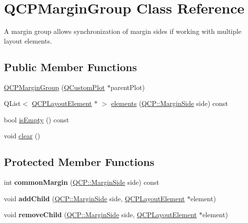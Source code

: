 \hypertarget{classQCPMarginGroup}{\section{\-Q\-C\-P\-Margin\-Group \-Class \-Reference}
\label{classQCPMarginGroup}
}


\-A margin group allows synchronization of margin sides if working with multiple layout elements.  


\subsection*{\-Public \-Member \-Functions}
\begin{DoxyCompactItemize}
\item 
\hyperlink{classQCPMarginGroup_ac481c20678ec5b305d6df330715f4b7b}{\-Q\-C\-P\-Margin\-Group} (\hyperlink{classQCustomPlot}{\-Q\-Custom\-Plot} $\ast$parent\-Plot)
\item 
\-Q\-List$<$ \hyperlink{classQCPLayoutElement}{\-Q\-C\-P\-Layout\-Element} $\ast$ $>$ \hyperlink{classQCPMarginGroup_a2f39e319c9ece34e0392c2ca350f1069}{elements} (\hyperlink{namespaceQCP_a7e487e3e2ccb62ab7771065bab7cae54}{\-Q\-C\-P\-::\-Margin\-Side} side) const 
\item 
bool \hyperlink{classQCPMarginGroup_a28c8e87a0b87c01bd28c693faabddd7b}{is\-Empty} () const 
\item 
void \hyperlink{classQCPMarginGroup_a144b67f216e4e86c3a3a309e850285fe}{clear} ()
\end{DoxyCompactItemize}
\subsection*{\-Protected \-Member \-Functions}
\begin{DoxyCompactItemize}
\item 
\hypertarget{classQCPMarginGroup_aeaeba9068dba2ef8be41449f0f2582f7}{int {\bfseries common\-Margin} (\hyperlink{namespaceQCP_a7e487e3e2ccb62ab7771065bab7cae54}{\-Q\-C\-P\-::\-Margin\-Side} side) const }\label{classQCPMarginGroup_aeaeba9068dba2ef8be41449f0f2582f7}

\item 
\hypertarget{classQCPMarginGroup_acb9c3a35acec655c2895b7eb95ee0524}{void {\bfseries add\-Child} (\hyperlink{namespaceQCP_a7e487e3e2ccb62ab7771065bab7cae54}{\-Q\-C\-P\-::\-Margin\-Side} side, \hyperlink{classQCPLayoutElement}{\-Q\-C\-P\-Layout\-Element} $\ast$element)}\label{classQCPMarginGroup_acb9c3a35acec655c2895b7eb95ee0524}

\item 
\hypertarget{classQCPMarginGroup_a20ab3286062957d99b58db683fe725b0}{void {\bfseries remove\-Child} (\hyperlink{namespaceQCP_a7e487e3e2ccb62ab7771065bab7cae54}{\-Q\-C\-P\-::\-Margin\-Side} side, \hyperlink{classQCPLayoutElement}{\-Q\-C\-P\-Layout\-Element} $\ast$element)}\label{classQCPMarginGroup_a20ab3286062957d99b58db683fe725b0}

\end{DoxyCompactItemize}
